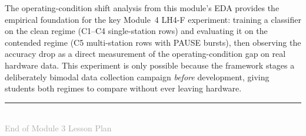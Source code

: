\documentclass[11pt,letterpaper]{article}
\begin{document}
	The operating-condition shift analysis from this module's EDA provides the empirical foundation for the key Module~4 LH4-F experiment: training a classifier on the clean regime (C1--C4 single-station rows) and evaluating it on the contended regime (C5 multi-station rows with PAUSE bursts), then observing the accuracy drop as a direct measurement of the operating-condition gap on real hardware data. This experiment is only possible because the framework stages a deliberately bimodal data collection campaign \emph{before} \ML{} development, giving students both regimes to compare without ever leaving hardware.

	\vfill
	\clearpage
	\printnoidxglossary[type=\acronymtype,title={Glossary}]

	\begin{center}
		\rule{0.5\textwidth}{0.4pt}\\[6pt]
		{\small\textcolor{darkgray}{End of Module 3 Lesson Plan}}
	\end{center}
\end{document}
